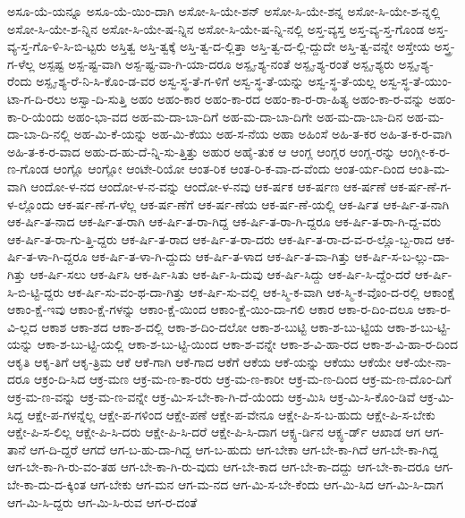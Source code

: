 {ಅಸೂ-ಯೆ-ಯನ್ನೂ
ಅಸೂ-ಯೆ-ಯಿಂ-ದಾಗಿ
ಅಸೋ-ಸಿ-ಯೇ-ಶನ್
ಅಸೋ-ಸಿ-ಯೇ-ಶನ್ನ
ಅಸೋ-ಸಿ-ಯೇ-ಶ-ನ್ನಲ್ಲಿ
ಅಸೋ-ಸಿ-ಯೇ-ಶ-ನ್ನಿನ
ಅಸೋ-ಸಿ-ಯೇ-ಷ-ನ್ನಿನ
ಅಸೋ-ಸಿ-ಯೇ-ಷ-ನ್ನಿ-ನಲ್ಲಿ
ಅಸ್ತ-ವ್ಯಸ್ತ
ಅಸ್ತ-ವ್ಯ-ಸ್ತ-ಗೊಂಡ
ಅಸ್ತ-ವ್ಯ-ಸ್ತ-ಗೊ-ಳಿ-ಸಿ-ಬಿ-ಟ್ಟರು
ಅಸ್ತಿತ್ವ
ಅಸ್ತಿ-ತ್ವಕ್ಕೆ
ಅಸ್ತಿ-ತ್ವ-ದ-ಲ್ಲಿತ್ತಾ
ಅಸ್ತಿ-ತ್ವ-ದ-ಲ್ಲಿ-ದ್ದುದೇ
ಅಸ್ತಿ-ತ್ವ-ವನ್ನೇ
ಅಸ್ತೇಯ
ಅಸ್ತ್ರ-ಗ-ಳೆಲ್ಲ
ಅಸ್ಪಷ್ಟ
ಅಸ್ಪ-ಷ್ಟ-ವಾಗಿ
ಅಸ್ಪ-ಷ್ಟ-ವಾ-ಗಿ-ಯಾ-ದರೂ
ಅಸ್ಪೃ-ಶ್ಯ-ನಂತೆ
ಅಸ್ಪೃ-ಶ್ಯ-ರಂತೆ
ಅಸ್ಪೃ-ಶ್ಯರು
ಅಸ್ಪೃ-ಶ್ಯ-ರೆಂದು
ಅಸ್ಪೃ-ಶ್ಯ-ರೆ-ನಿ-ಸಿ-ಕೊಂ-ಡ-ವರ
ಅಸ್ವ-ಸ್ಥ-ತೆ-ಗ-ಳಿಗೆ
ಅಸ್ವ-ಸ್ಥ-ತೆ-ಯನ್ನು
ಅಸ್ವ-ಸ್ಥ-ತೆ-ಯಲ್ಲ
ಅಸ್ವ-ಸ್ಥ-ತೆ-ಯುಂ-ಟಾ-ಗ-ದಿ-ರಲು
ಅಸ್ವಾ-ದಿ-ಸುತ್ತಿ
ಅಹಂ
ಅಹಂ-ಕಾರ
ಅಹಂ-ಕಾ-ರದ
ಅಹಂ-ಕಾ-ರ-ರಾ-ಹಿತ್ಯ
ಅಹಂ-ಕಾ-ರ-ವನ್ನು
ಅಹಂ-ಕಾ-ರಿ-ಯೆಂದು
ಅಹಂ-ಭಾ-ವದ
ಅಹ-ಮ-ದಾ-ಬಾ-ದಿಗೆ
ಅಹ-ಮ-ದಾ-ಬಾ-ದಿಗೇ
ಅಹ-ಮ-ದಾ-ಬಾ-ದಿನ
ಅಹ-ಮ-ದಾ-ಬಾ-ದಿ-ನಲ್ಲಿ
ಅಹ-ಮಿ-ಕೆ-ಯನ್ನು
ಅಹ-ಮಿ-ಕೆಯು
ಅಹ-ಸ-ನೆಯ
ಅಹಾ
ಅಹಿಂಸೆ
ಅಹಿ-ತ-ಕರ
ಅಹಿ-ತ-ಕ-ರ-ವಾಗಿ
ಅಹಿ-ತ-ಕ-ರ-ವಾದ
ಅಹು-ದ-ಹು-ದೆ-ನ್ನಿ-ಸು-ತ್ತಿತ್ತು
ಅಹುರ
ಅಹೈ-ತುಕ
ಆ
ಆಂಗ್ಲ
ಆಂಗ್ಲರ
ಆಂಗ್ಲ-ರನ್ನು
ಆಂಗ್ಲೀ-ಕ-ರ-ಣ-ಗೊಂಡ
ಆಂಗ್ಲೊ
ಆಂಗ್ಲೋ
ಆಂಟೇ-ರಿಯೋ
ಆಂತ-ರಿಕ
ಆಂತ-ರಿ-ಕ-ವಾ-ದ-ವೆಂದು
ಆಂತ-ರ್ಯ-ದಿಂದ
ಆಂತಿ-ಮ-ವಾಗಿ
ಆಂದೋ-ಳ-ನದ
ಆಂದೋ-ಳ-ನ-ವನ್ನು
ಆಂದೋ-ಳ-ನವು
ಆಕ-ರ್ಷಕ
ಆಕ-ರ್ಷಣ
ಆಕ-ರ್ಷಣೆ
ಆಕ-ರ್ಷ-ಣೆ-ಗ-ಳ-ಲ್ಲೊಂದು
ಆಕ-ರ್ಷ-ಣೆ-ಗ-ಳೆಲ್ಲ
ಆಕ-ರ್ಷ-ಣೆಗೆ
ಆಕ-ರ್ಷ-ಣೆಯ
ಆಕ-ರ್ಷ-ಣೆ-ಯಲ್ಲಿ
ಆಕ-ರ್ಷಿತ
ಆಕ-ರ್ಷಿ-ತ-ನಾಗಿ
ಆಕ-ರ್ಷಿ-ತ-ನಾದ
ಆಕ-ರ್ಷಿ-ತ-ರಾಗಿ
ಆಕ-ರ್ಷಿ-ತ-ರಾ-ಗಿದ್ದ
ಆಕ-ರ್ಷಿ-ತ-ರಾ-ಗಿ-ದ್ದರೂ
ಆಕ-ರ್ಷಿ-ತ-ರಾ-ಗಿ-ದ್ದ-ವರು
ಆಕ-ರ್ಷಿ-ತ-ರಾ-ಗು-ತ್ತಿ-ದ್ದರು
ಆಕ-ರ್ಷಿ-ತ-ರಾದ
ಆಕ-ರ್ಷಿ-ತ-ರಾ-ದರು
ಆಕ-ರ್ಷಿ-ತ-ರಾ-ದ-ವ-ರ-ಲ್ಲೊ-ಬ್ಬ-ರಾದ
ಆಕ-ರ್ಷಿ-ತ-ಳಾ-ಗಿ-ದ್ದರೂ
ಆಕ-ರ್ಷಿ-ತ-ಳಾ-ಗಿ-ದ್ದುದು
ಆಕ-ರ್ಷಿ-ತ-ಳಾದ
ಆಕ-ರ್ಷಿ-ತ-ವಾ-ಗಿತ್ತು
ಆಕ-ರ್ಷಿ-ಸ-ಬ-ಲ್ಲು-ದಾ-ಗಿತ್ತು
ಆಕ-ರ್ಷಿ-ಸಲು
ಆಕ-ರ್ಷಿಸಿ
ಆಕ-ರ್ಷಿ-ಸಿತು
ಆಕ-ರ್ಷಿ-ಸಿ-ದುವು
ಆಕ-ರ್ಷಿ-ಸಿದ್ದು
ಆಕ-ರ್ಷಿ-ಸಿ-ದ್ದೆಂ-ದರೆ
ಆಕ-ರ್ಷಿ-ಸಿ-ಬಿ-ಟ್ಟಿ-ದ್ದರು
ಆಕ-ರ್ಷಿ-ಸು-ವಂ-ಥ-ದಾ-ಗಿತ್ತು
ಆಕ-ರ್ಷಿ-ಸು-ವಲ್ಲಿ
ಆಕ-ಸ್ಮಿ-ಕ-ವಾಗಿ
ಆಕ-ಸ್ಮಿ-ಕ-ವೊಂ-ದ-ರಲ್ಲಿ
ಆಕಾಂಕ್ಷೆ
ಆಕಾಂ-ಕ್ಷೆ-ಇವು
ಆಕಾಂ-ಕ್ಷೆ-ಗಳನ್ನು
ಆಕಾಂ-ಕ್ಷೆ-ಯಿಂದ
ಆಕಾಂ-ಕ್ಷೆ-ಯಿಂ-ದಾ-ಗಲಿ
ಆಕಾರ
ಆಕಾ-ರ-ದಿಂ-ದಲೂ
ಆಕಾ-ರ-ವಿ-ಲ್ಲದ
ಆಕಾಶ
ಆಕಾ-ಶದ
ಆಕಾ-ಶ-ದಲ್ಲಿ
ಆಕಾ-ಶ-ದಿಂ-ದಲೋ
ಆಕಾ-ಶ-ಬುಟ್ಟಿ
ಆಕಾ-ಶ-ಬು-ಟ್ಟಿಯ
ಆಕಾ-ಶ-ಬು-ಟ್ಟಿ-ಯನ್ನು
ಆಕಾ-ಶ-ಬು-ಟ್ಟಿ-ಯಲ್ಲಿ
ಆಕಾ-ಶ-ಬು-ಟ್ಟಿ-ಯಿಂದ
ಆಕಾ-ಶ-ವನ್ನೇ
ಆಕಾ-ಶ-ವಿ-ಹಾ-ರದ
ಆಕಾ-ಶ-ವಿ-ಹಾ-ರ-ದಿಂದ
ಆಕೃತಿ
ಆಕೃ-ತಿಗೆ
ಆಕೃ-ತ್ರಿಮ
ಆಕೆ
ಆಕೆ-ಗಾಗಿ
ಆಕೆ-ಗಾದ
ಆಕೆಗೆ
ಆಕೆಯ
ಆಕೆ-ಯನ್ನು
ಆಕೆಯು
ಆಕೆಯೇ
ಆಕೆ-ಯೇ-ನಾ-ದರೂ
ಆಕ್ರಂ-ದಿ-ಸಿದ
ಆಕ್ರ-ಮಣ
ಆಕ್ರ-ಮ-ಣ-ಕಾ-ರರು
ಆಕ್ರ-ಮ-ಣ-ಕಾರೀ
ಆಕ್ರ-ಮ-ಣ-ದಿಂದ
ಆಕ್ರ-ಮ-ಣ-ದೊಂ-ದಿಗೆ
ಆಕ್ರ-ಮ-ಣ-ವನ್ನು
ಆಕ್ರ-ಮ-ಣ-ವನ್ನೇ
ಆಕ್ರ-ಮಿ-ಸ-ಬೇ-ಕಾ-ಗಿ-ದೆ-ಯೆಂದು
ಆಕ್ರ-ಮಿಸಿ
ಆಕ್ರ-ಮಿ-ಸಿ-ಕೊಂ-ಡಿವೆ
ಆಕ್ರ-ಮಿ-ಸಿದ್ದ
ಆಕ್ಷೇ-ಪ-ಗಳನ್ನೆಲ್ಲ
ಆಕ್ಷೇ-ಪ-ಗಳಿಂದ
ಆಕ್ಷೇ-ಪಣೆ
ಆಕ್ಷೇ-ಪ-ವೇನೂ
ಆಕ್ಷೇ-ಪಿ-ಸ-ಬ-ಹುದು
ಆಕ್ಷೇ-ಪಿ-ಸ-ಬೇಕು
ಆಕ್ಷೇ-ಪಿ-ಸ-ಲಿಲ್ಲ
ಆಕ್ಷೇ-ಪಿ-ಸಿ-ದರು
ಆಕ್ಷೇ-ಪಿ-ಸಿ-ದರೆ
ಆಕ್ಷೇ-ಪಿ-ಸಿ-ದಾಗ
ಆಕ್ಸ್ಫ-ರ್ಡಿನ
ಆಕ್ಸ್ಫ-ರ್ಡ್
ಆಖಾಡ
ಆಗ
ಆಗ-ತಾನೆ
ಆಗ-ದಿ-ದ್ದರೆ
ಆಗದೆ
ಆಗ-ಬ-ಹು-ದಾ-ಗಿದ್ದ
ಆಗ-ಬ-ಹುದು
ಆಗ-ಬೇಕಾ
ಆಗ-ಬೇ-ಕಾ-ಗಿದೆ
ಆಗ-ಬೇ-ಕಾ-ಗಿದ್ದ
ಆಗ-ಬೇ-ಕಾ-ಗಿ-ರು-ವಂ-ತಹ
ಆಗ-ಬೇ-ಕಾ-ಗಿ-ರು-ವುದು
ಆಗ-ಬೇ-ಕಾದ
ಆಗ-ಬೇ-ಕಾ-ದದ್ದು
ಆಗ-ಬೇ-ಕಾ-ದರೂ
ಆಗ-ಬೇ-ಕಾ-ದು-ದ-ಕ್ಕಿಂತ
ಆಗ-ಬೇಕು
ಆಗ-ಮನ
ಆಗ-ಮ-ನದ
ಆಗ-ಮಿ-ಸ-ಬೇ-ಕೆಂದು
ಆಗ-ಮಿ-ಸಿದ
ಆಗ-ಮಿ-ಸಿ-ದಾಗ
ಆಗ-ಮಿ-ಸಿ-ದ್ದರು
ಆಗ-ಮಿ-ಸಿ-ರುವ
ಆಗ-ರ-ದಂತೆ
}
